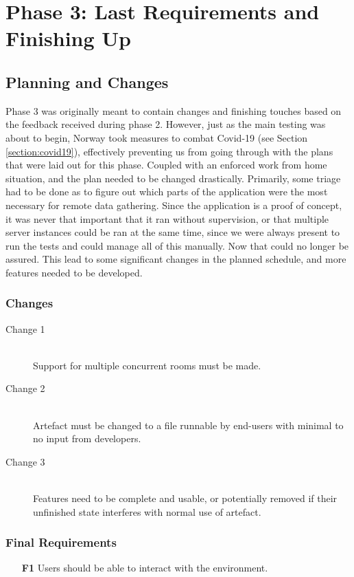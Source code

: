 
\chapter{Phase 3: Last Requirements and Finishing Up} \label{chap:7}
\label{chap:phase3}

\section{Planning and Changes}
Phase 3 was originally meant to contain changes and finishing touches based on the feedback received during phase 2. However, just as the main testing was about to begin, Norway took measures to combat Covid-19 (see Section \ref{section:covid19}), effectively preventing us from going through with the plans that were laid out for this phase. Coupled with an enforced work from home situation, and the plan needed to be changed drastically. Primarily, some triage had to be done as to figure out which parts of the application were the most necessary for remote data gathering. Since the application is a proof of concept, it was never that important that it ran without supervision, or that multiple server instances could be ran at the same time, since we were always present to run the tests and could manage all of this manually. Now that could no longer be assured. This lead to some significant changes in the planned schedule, and more features needed to be developed.

\subsection{Changes}
\begin{description}
    \item [Change 1]\hfill \\
    Support for multiple concurrent rooms must be made. 
    \item [Change 2]\hfill \\
    Artefact must be changed to a file runnable by end-users with minimal to no input from developers.
    \item [Change 3]\hfill \\
    Features need to be complete and usable, or potentially removed if their unfinished state interferes with normal use of artefact.
\end{description}

\subsection{Final Requirements}
\begin{enumerate}
  \item [\textbf{F1}] Users should be able to interact with the environment.
\end{enumerate}



